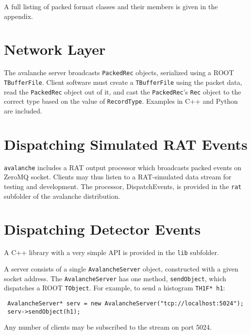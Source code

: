 \documentclass{article}
\begin{document}
A full listing of packed format classes and their members is given in the appendix.

\section{Network Layer}
The avalanche server broadcasts {\tt PackedRec} objects, serialized using a ROOT {\tt TBufferFile}. Client software must create a {\tt TBufferFile} using the packet data, read the {\tt PackedRec} object out of it, and cast the {\tt PackedRec}'s {\tt Rec} object to the correct type based on the value of {\tt RecordType}. Examples in C++ and Python are included.

\section{Dispatching Simulated RAT Events}
{\tt avalanche} includes a RAT output processor which broadcasts packed events on ZeroMQ socket. Clients may thus listen to a RAT-simulated data stream for testing and development. The processor, DispatchEvents, is provided in the {\tt rat} subfolder of the avalanche distribution.

\section{Dispatching Detector Events}
A C++ library with a very simple API is provided in the {\tt lib} subfolder.

A server consists of a single {\tt AvalancheServer} object, constructed with a given socket address. The {\tt AvalancheServer} has one method, {\tt sendObject}, which dispatches a ROOT {\tt TObject}. For example, to send a histogram {\tt TH1F* h1}:

\begin{verbatim}
 AvalancheServer* serv = new AvalancheServer("tcp://localhost:5024");
 serv->sendObject(h1);
\end{verbatim}

Any number of clients may be subscribed to the stream on port 5024.

\end{document}
